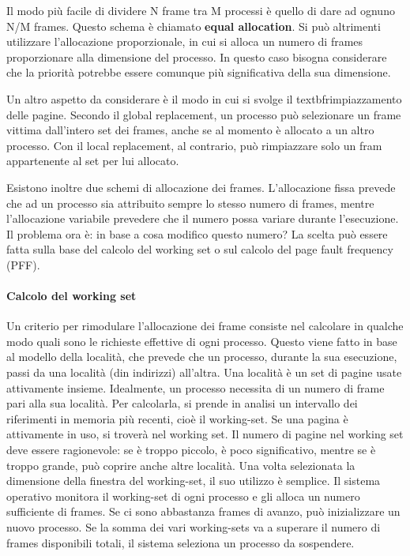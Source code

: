 \documentclass[a4]{article}
\begin{document}
Il modo più facile di dividere N frame tra M processi è quello di dare ad ognuno N/M frames. Questo schema è chiamato \textbf{equal allocation}. Si può altrimenti utilizzare l'allocazione proporzionale, in cui si alloca un numero di frames proporzionare alla dimensione del processo. In questo caso bisogna considerare che la priorità potrebbe essere comunque più significativa della sua dimensione.

Un altro aspetto da considerare è il modo in cui si svolge il textbf{rimpiazzamento delle pagine}. Secondo il global replacement, un processo può selezionare un frame vittima dall'intero set dei frames, anche se al momento è allocato a un altro processo. Con il local replacement, al contrario, può rimpiazzare solo un fram appartenente al set per lui allocato.

Esistono inoltre due schemi di allocazione dei frames. L'allocazione fissa prevede che ad un processo sia attribuito sempre lo stesso numero di frames, mentre l'allocazione variabile prevedere che il numero possa variare durante l'esecuzione. Il problema ora è: in base a cosa modifico questo numero? La scelta può essere fatta sulla base del calcolo del working set o sul calcolo del page fault frequency (PFF).

\paragraph{Calcolo del working set}
Un criterio per rimodulare l'allocazione dei frame consiste nel calcolare in qualche modo quali sono le richieste effettive di ogni processo. Questo viene fatto in base al modello della località, che prevede che un processo, durante la sua esecuzione, passi da una località (din indirizzi) all'altra. Una località è un set di pagine usate attivamente insieme. Idealmente, un processo necessita di un numero di frame pari alla sua località. Per calcolarla, si prende in analisi un intervallo dei riferimenti in memoria più recenti, cioè il working-set. Se una pagina è attivamente in uso, si troverà nel working set. Il numero di pagine nel working set deve essere ragionevole: se è troppo piccolo, è poco significativo, mentre se è troppo grande, può coprire anche altre località. Una volta selezionata la dimensione della finestra del working-set, il suo utilizzo è semplice. Il sistema operativo monitora il working-set di ogni processo e gli alloca un numero sufficiente di frames. Se ci sono abbastanza frames di avanzo, può inizializzare un nuovo processo. Se la somma dei vari working-sets va a superare il numero di frames disponibili totali, il sistema seleziona un processo da sospendere.
\end{document}
